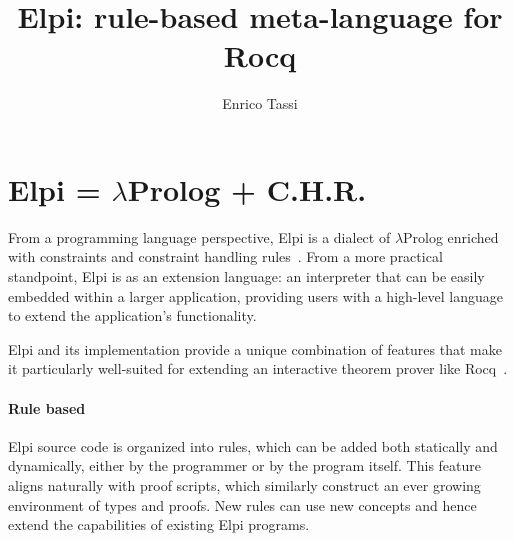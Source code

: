 \documentclass[sigplan,natbib=false]{acmart}
\author{Enrico Tassi}
\affiliation{%
    \institution{Université Côte d'Azur, Inria}
    \country{France}
}
\title{Elpi: rule-based meta-language for Rocq}
\begin{document}
\maketitle

\section{Elpi = $\lambda$Prolog + C.H.R.}

% 

From a programming language perspective, Elpi is a dialect of $\lambda$Prolog
enriched with constraints and constraint handling rules~\cite{dunchev15lpar,TASSI_2019}. From a more practical
standpoint, Elpi is as an extension language: an interpreter that can be easily
embedded within a larger application, providing users with a high-level
language to extend the application's functionality.

Elpi and its implementation provide a unique combination of features that make
it particularly well-suited for extending an interactive theorem prover like
Rocq~\cite{tassi:hal-01637063}.

\paragraph{Rule based}

Elpi source code is organized into rules, which can be added both statically
and dynamically, either by the programmer or by the program itself. This
feature aligns naturally with proof scripts, which similarly construct an ever
growing environment of types and proofs. New rules can use new concepts and
hence extend the capabilities of existing Elpi programs.
\end{document}
